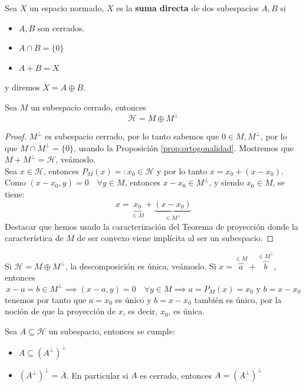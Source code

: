 \begin{definicion}
    Sea $X$ un espacio normado, $X$ es la \textbf{suma directa} de dos subespacios $A, B$ si
    \begin{itemize}
        \item $A, B$ son cerrados.
        \item $A \cap B = \{0\}$
        \item $A + B = X$
    \end{itemize}
    y diremos $X = A \oplus B$.
\end{definicion}

\begin{teo}
    Sea $M$ un subespacio cerrado, entonces 
    $$\mathcal{H} = M \oplus M^\perp$$
\begin{proof}
    $M^\perp$ es subespacio cerrado, por lo tanto sabemos que $0\in M, M^\perp$, por lo que $M \cap M^\perp = \{0\}$, usando la Proposición \ref{prop:ortogonalidad}. Mostremos que $M + M^\perp = \mathcal{H}$, veámoslo. \\

    \noindent
    Sea $x \in \mathcal{H}$, entonces $P_M(x) =: x_0 \in \mathcal{H}$ y por lo tanto $x = x_0 + (x - x_0)$. 
    Como \mbox{$(x - x_0, y) = 0 \quad \forall y \in M$}, entonces $x - x_0 \in M^\perp$, y siendo $x_0 \in M$, se tiene:
    \[ x = \underbrace{x_0}_{\in M} + \underbrace{(x - x_0)}_{\in M^\perp}\]
    Destacar que hemos usado la caracterización del Teorema de proyección donde la característica de $M$ de ser convexo viene implícita al ser un subespacio. 
\end{proof}
\end{teo}

\begin{observacion}
    Si $\mathcal{H} = M \oplus M^\perp$, la descomposición es única, veámoslo. Si $x = \overbrace{a}^{\in M} + \overbrace{b}^{\in M^\perp}$, entonces 
    $$x - a = b \in M^\perp \implies (x - a, y) = 0 \quad \forall y \in M \implies a = P_M(x) = x_0 \text{ y } b = x - x_0$$
    tenemos por tanto que $a=x_0$ es único y $b = x - x_0$ también es único, por la noción de que la proyección de $x$, es decir, $x_0$, es única.
\end{observacion}

\begin{observacion}
    Sea $A \subseteq \mathcal{H}$ un subespacio, entonces se cumple:
    \begin{itemize}
        \item[i)] $A \subseteq (A^\perp)^\perp$
        \item[ii)] $(A^\perp)^\perp = \overline{A}$. En particular si $A$ es cerrado, entonces $A = (A^\perp)^\perp$
    \end{itemize}
\end{observacion}


